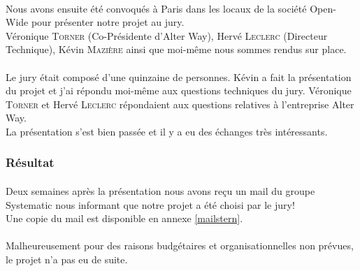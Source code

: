 \paragraph*{}
Nous avons ensuite été convoqués à Paris dans les locaux de la société Open-Wide pour présenter notre projet au jury.
\\
Véronique \textsc{Torner} (Co-Présidente d'Alter Way), Hervé \textsc{Leclerc} (Directeur Technique), Kévin \textsc{Mazière} ainsi que moi-même nous sommes rendus sur place.

\paragraph*{}
Le jury était composé d'une quinzaine de personnes. Kévin a fait la présentation du projet et j'ai répondu moi-même aux questions techniques du jury. Véronique \textsc{Torner}
et Hervé \textsc{Leclerc} répondaient aux questions relatives à l'entreprise Alter Way.
\\
La présentation s'est bien passée et il y a eu des échanges très intéressants.


\subsubsection{Résultat}
\paragraph*{}
Deux semaines après la présentation nous avons reçu un mail du groupe Systematic nous informant que notre projet a été choisi par le jury!\\
Une copie du mail est disponible en annexe \ref{mailstern}.

\paragraph*{}
Malheureusement pour des raisons budgétaires et organisationnelles non prévues, le projet n'a pas eu de suite.
%
%



